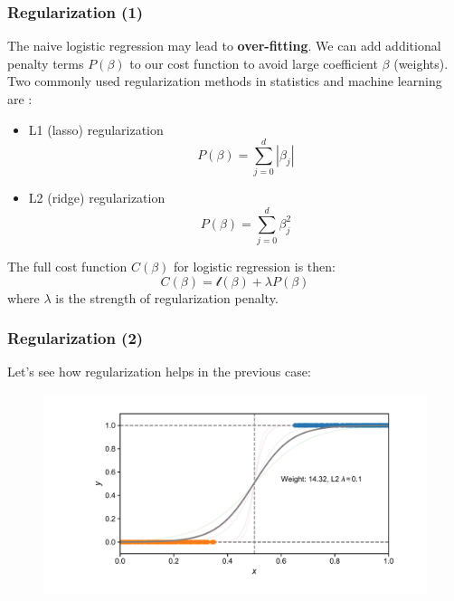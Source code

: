 \documentclass[10pt,aspectratio=169]{beamer}
\begin{document}
      \begin{frame}
        \frametitle{Regularization (1)}

        The naive logistic regression may lead to
        \textbf{over-fitting}.  We can add additional penalty terms
        $P(\beta)$ to our cost function to avoid large coefficient
        $\beta$ (weights). Two commonly used regularization methods in
        statistics and machine learning are
        \let\thefootnote\relax{}:

        \begin{itemize}
        \item L1 (lasso) regularization
          \begin{equation*}
            P(\beta) = \sum_{j=0}^{d} |\beta_{j}| 
          \end{equation*}

          
        \item L2 (ridge) regularization
          \begin{equation*}
            P(\beta) = \sum_{j=0}^{d} \beta_{j}^{2}
          \end{equation*}
        \end{itemize}

        The full cost function $C(\beta)$ for logistic regression is
        then:
        \begin{equation*}
          C(\beta) = \mathscr{l}(\beta) + \lambda P(\beta)
        \end{equation*}
        where $\lambda$ is the strength of regularization penalty.
      \end{frame}

      \begin{frame}
        \frametitle{Regularization (2)}
        Let's see how regularization helps in the previous case:

        \begin{figure}[t]
          \includegraphics[width=\textwidth]{scripts/perfect_sep_reg.pdf}
        \end{figure}
      \end{frame}
\end{document}
